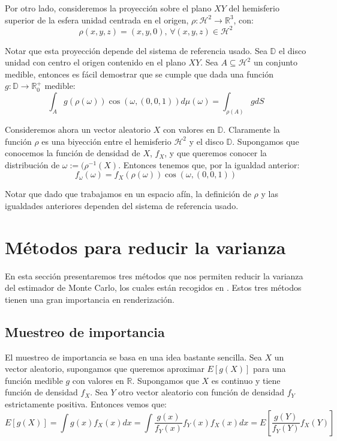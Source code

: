 Por otro lado, consideremos la proyección sobre el plano $XY$ del hemisferio superior de la esfera unidad centrada en el origen, $\rho:\mathcal{H}^2\rightarrow \mathds{R}^3$, con:
\begin{equation}\label{proyeccionAnguloSolido}
\rho(x,y,z) = (x,y,0)\text{, }\forall (x,y,z)\in\mathcal{H}^2
\end{equation}

Notar que esta proyección depende del sistema de referencia usado. Sea $\mathds{D}$ el disco unidad con centro el origen contenido en el plano $XY$. Sea $A\subseteq\mathcal{H}^2$ un conjunto medible, entonces es fácil demostrar que se cumple que dada una función $g:\mathds{D}\rightarrow \mathds{R}_0^+$ medible:
$$\int_A g(\rho(\omega)) \cos(\omega, (0,0,1))d\mu(\omega) = \int_{\rho(A)} g dS$$

Consideremos ahora un vector aleatorio $X$ con valores en $\mathds{D}$. Claramente la función $\rho$ es una biyección entre el hemisferio $\mathcal{H}^2$ y el disco $\mathds{D}$. Supongamos que conocemos la función de densidad de $X$, $f_X$, y que queremos conocer la distribución de $\omega:=(\rho^{-1}(X)$. Entonces tenemos que, por la igualdad anterior:
\begin{equation}\label{cambioProyectado}
f_{\omega}(\omega) = f_{X}(\rho(\omega)) \cos(\omega, (0,0,1))
\end{equation}

Notar que dado que trabajamos en un espacio afín, la definición de $\rho$ y las igualdades anteriores dependen del sistema de referencia usado.

\section{Métodos para reducir la varianza}
En esta sección presentaremos tres métodos que nos permiten reducir la varianza del estimador de Monte Carlo, los cuales están recogidos en \cite{Veach97}. Estos tres métodos tienen una gran importancia en renderización.

\subsection{Muestreo de importancia}\label{MI}

El muestreo de importancia se basa en una idea bastante sencilla. Sea $X$ un vector aleatorio, supongamos que queremos aproximar $E[g(X)]$ para una función medible $g$ con valores en $\mathds{R}$. Supongamos que $X$ es continuo y tiene función de densidad $f_X$. Sea $Y$ otro vector aleatorio con función de densidad $f_Y$ estrictamente positiva. Entonces vemos que:
$$E[g(X)]=\int g(x)f_X(x)dx = \int \frac{g(x)}{f_Y(x)}f_Y(x)f_X(x)dx = E[\frac{g(Y)}{f_Y(Y)}f_X(Y)]$$


